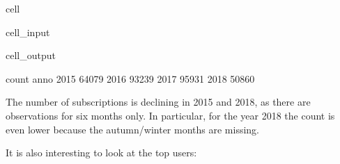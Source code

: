 \documentclass[letterpaper,10pt,english]{jupyterBook}
\begin{document}
\begin{sphinxuseclass}{cell}
\begin{sphinxuseclass}{cell_input}
\begin{sphinxVerbatim}[commandchars=\\\{\}]
   
      
       


\end{sphinxVerbatim}

\end{sphinxuseclass}
\begin{sphinxuseclass}{cell_output}
\begin{sphinxVerbatim}[commandchars=\\\{\}]
      count
anno       
2015  64079
2016  93239
2017  95931
2018  50860
\end{sphinxVerbatim}

\end{sphinxuseclass}
\end{sphinxuseclass}
\sphinxAtStartPar
The number of subscriptions is declining in 2015 and 2018, as there are observations for six months only. In particular, for the year 2018 the count is even lower because the autumn/winter months are missing.

\sphinxAtStartPar
It is also interesting to look at the top users:
\end{document}
